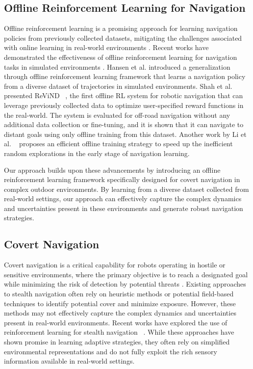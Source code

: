 \subsection{Offline Reinforcement Learning for Navigation}
Offline reinforcement learning is a promising approach for learning navigation policies from previously collected datasets, mitigating the challenges associated with online learning in real-world environments \cite{levine2020offline, fujimoto2019off}. Recent works have demonstrated the effectiveness of offline reinforcement learning for navigation tasks in simulated environments \cite{mandlekar2020iris, hansen2021generalization}. Hansen et al. \cite{hansen2021generalization} introduced a generalization through offline reinforcement learning framework that learns a navigation policy from a diverse dataset of trajectories in simulated environments. Shah et al.  presented ReViND ~\cite{shah2023offline}, the first offline RL system for robotic navigation that can leverage previously collected data to optimize user-specified reward functions in the real-world. The system is evaluated for off-road navigation without any additional data collection or fine-tuning, and it is shown that it can navigate to distant goals using only offline training from this dataset. Another work by Li et al. ~\cite{hao2023avoidance} proposes an efficient offline training strategy to speed up the inefficient random explorations in the early stage of navigation learning.

Our approach builds upon these advancements by introducing an offline reinforcement learning framework specifically designed for covert navigation in complex outdoor environments. By learning from a diverse dataset collected from real-world settings, our approach can effectively capture the complex dynamics and uncertainties present in these environments and generate robust navigation strategies.

\subsection{Covert Navigation}
Covert navigation is a critical capability for robots operating in hostile or sensitive environments, where the primary objective is to reach a designated goal while minimizing the risk of detection by potential threats \cite{ajai2019survey, niroui2019deep}. Existing approaches to stealth navigation often rely on heuristic methods \cite{tews2004avoiding} or potential field-based techniques \cite{marzouqideceptive} to identify potential cover and minimize exposure. However, these methods may not effectively capture the complex dynamics and uncertainties present in real-world environments. Recent works have explored the use of reinforcement learning for stealth navigation ~\cite{mendoncca2018reinforcement}. While these approaches have shown promise in learning adaptive strategies, they often rely on simplified environmental representations and do not fully exploit the rich sensory information available in real-world settings.

